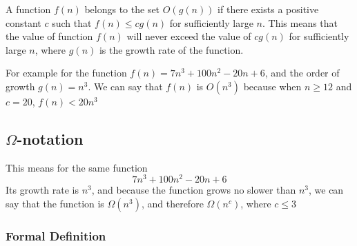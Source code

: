 \documentclass[12pt letter]{report}
\begin{document}
A function $f \left( n \right) $ belongs to the set $O \left( g \left( n \right)  \right) $ if there exists a positive
constant $c$ such that $f \left( n \right) \leq c g \left( n \right)  $ for sufficiently large $n$. This means that the
value of function $f \left( n \right) $ will never exceed the value of $c g \left( n \right) $ for sufficiently large
$n$, where $g \left( n \right) $ is the growth rate of the function.

For example for the function $f \left( n \right) = 7n^3 + 100n^2 - 20n + 6 $, and the order of growth $g \left( n
  \right) = n^3 $. We can say that $f \left( n \right) $ is $O \left( n^3 \right) $ because when $n \geq 12$ and $c =
  20$, $f \left( n \right) < 20n^3 $


\subsection{$\Omega$-notation}


This means for the same function
\[
  7n^3 + 100n^2 -20n + 6
\]
Its growth rate is $n^3$, and because the function grows no slower than $n^3$, we can say that the function is $\Omega
  \left( n^3 \right) $, and therefore $\Omega \left( n^c \right) $, where $c \leq 3$

\subsubsection{Formal Definition}
\end{document}

